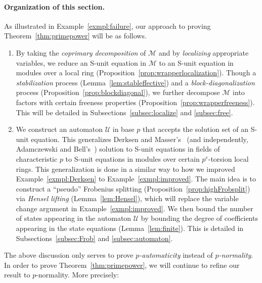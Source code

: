 \documentclass[letterpaper, 11pt, thm-restate]{article}
\numberwithin{equation}{section}
\newcommand{\mM}{\mathcal{M}}
\newcommand{\mmU}{\mathscr{U}}
\theoremstyle{definition}
\theoremstyle{definition}
\theoremstyle{definition}
\begin{document}
\paragraph{Organization of this section.}
As illustrated in Example~\ref{exmpl:failure}, our approach to proving Theorem~\ref{thm:primepower} will be as follows.
\begin{enumerate}[nosep, label = \arabic*.]
    \item By taking the \emph{coprimary decomposition} of $\mM$ and by \emph{localizing} appropriate variables, we reduce an S-unit equation in $\mM$ to an S-unit equation in modules over a local ring (Proposition~\ref{prop:wrapperlocalization}).
    Though a \emph{stabilization} process (Lemma~\ref{lem:stableffective}) and a \emph{block-diagonalization} process (Proposition~\ref{prop:blockdiagonal}), we further decompose $\mM$ into factors with certain freeness properties (Proposition~\ref{prop:wrapperfreeness}).
    This will be detailed in Subsections~\ref{subsec:localize} and \ref{subsec:free}.
    \item We construct an automaton $\mmU$ in base $p$ that accepts the solution set of an S-unit equation.
    This generalizes Derksen and Masser's~\cite{derksen2007skolem, derksen2012linear} (and independently, Adamczewski and Bell's~\cite{adamczewski2012vanishing}) solution to S-unit equations in fields of characteristic $p$ to S-unit equations in modules over certain $p^e$-torsion local rings.
    This generalization is done in a similar way to how we improved Example~\ref{exmpl:Derksen} to Example~\ref{exmpl:improved}.
    The main idea is to construct a ``pseudo'' Frobenius splitting (Proposition~\ref{prop:highFrobsplit}) via \emph{Hensel lifting} (Lemma~\ref{lem:Hensel}), which will replace the variable change argument in Example~\ref{exmpl:improved}.
    We then bound the number of states appearing in the automaton $\mmU$ by bounding the degree of coefficients appearing in the state equations (Lemma~\ref{lem:finite}).
    This is detailed in Subsections~\ref{subsec:Frob} and \ref{subsec:automaton}.
    \setcounter{SummaryCounter}{\value{enumi}}
\end{enumerate}
The above discussion only serves to prove \emph{$p$-automaticity} instead of \emph{$p$-normality}.
In order to prove Theorem~\ref{thm:primepower}, we will continue to refine our result to $p$-normality.
More precisely:
\end{document}

